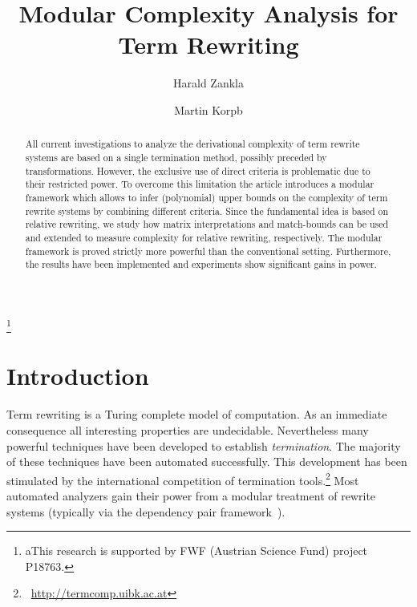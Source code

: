 \documentclass{LMCS}
\theoremstyle{plain}\newtheorem{mainthm}[thm]{Main Theorem}
\begin{document}
\title[Modular Complexity Analysis]{Modular Complexity Analysis for
  Term Rewriting\rsuper*}

\author[H.~Zankl]{Harald Zankl\rsuper a}
\address{{}Institute of Computer Science\\University of
  Innsbruck\\Austria} 
\thanks{{\lsuper a}This research is supported by FWF (Austrian Science Fund)
  project P18763.}

\author[M.~Korp]{Martin Korp\rsuper b}
\address{\vspace{-18 pt}}





\begin{abstract}
\noindent
All current investigations to analyze the derivational complexity of term
rewrite systems are based on a single termination method, possibly
preceded by transformations. However, the exclusive use of direct
criteria is problematic due to their restricted power. To overcome this
limitation the article introduces a modular framework which allows to 
infer (polynomial) upper bounds on the complexity of term rewrite systems
by combining different criteria. Since the fundamental idea is based on 
relative rewriting, we study how matrix interpretations and match-bounds
can be used and extended to measure complexity for relative rewriting, 
respectively.
The modular framework is proved strictly more powerful than the conventional
setting. Furthermore, the results have been implemented and experiments
show significant gains in power.
\end{abstract}

\maketitle

\section{Introduction}

Term rewriting is a Turing complete model of computation. As an immediate
consequence all interesting properties are undecidable. Nevertheless many
powerful techniques have been developed to establish \emph{termination}.
The majority of these techniques have been automated successfully.
This development has been stimulated by the international competition of
termination tools.\footnote{\ \label{FOO:comp}\url{http://termcomp.uibk.ac.at}}
Most automated analyzers gain their power from a modular treatment
of rewrite systems (typically via the dependency pair
framework~\cite{AG00,HM05,T07}).
\end{document}
